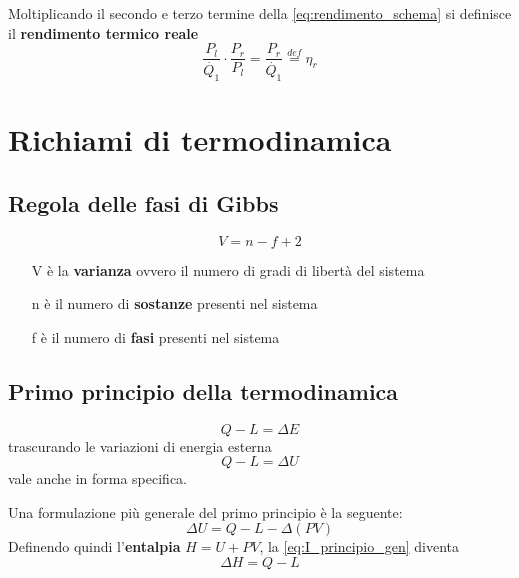 \documentclass[a4paper,12pt]{article}
\begin{document}
Moltiplicando il secondo e terzo termine della \eqref{eq:rendimento_schema} si 
definisce il \textbf{rendimento termico reale}
\begin{equation}
\label{eq:rendimento_reale}
    \frac{P_l}{\dot{Q_1}}\cdot \frac{P_r}{P_l} = \frac{P_r}{\dot{Q_1}} \stackrel{def}{=} 
     \eta_r
\end{equation}

\section{Richiami di termodinamica}
\label{sec:termodinamica}
\subsection{Regola delle fasi di Gibbs}
\begin{equation}
    \label{eq:fasi_gibbs}
    V = n - f + 2
\end{equation}
\begin{itemize}
    \item[V] è la \textbf{varianza} ovvero il numero di gradi di libertà del sistema
    \item[n] è il numero di \textbf{sostanze} presenti nel sistema
    \item[f] è il numero di \textbf{fasi} presenti nel sistema
\end{itemize}
\subsection{Primo principio della termodinamica}
\label{subsec:primo_principio}
\begin{equation}
    Q - L = \Delta E
\end{equation}
trascurando le variazioni di energia esterna
\begin{equation}
    Q - L = \Delta U
\end{equation}
vale anche in forma specifica.

Una formulazione più generale del primo principio è la seguente:
\begin{equation}
    \label{eq:I_principio_gen}
    \Delta U = Q - L - \Delta(PV)
\end{equation}
Definendo quindi l'\textbf{entalpia} \(H = U+PV\), la \eqref{eq:I_principio_gen} diventa
\begin{equation}
    \label{eq:I_principio_aperti}
    \Delta H = Q - L
\end{equation}
\end{document}
